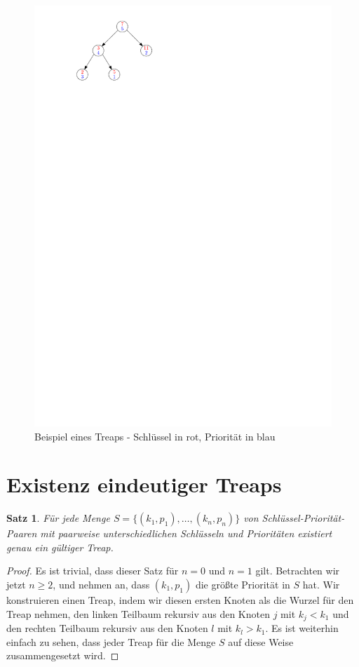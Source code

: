 \documentclass[a4paper]{scrreprt}
\newtheorem{satz}{Satz}[chapter]
\theoremstyle{definition}
\newenvironment{beweis}{\begin{proof}}{\end{proof}}
\begin{document}
\begin{figure}
\centering
\label{img:exampletreap}
\includegraphics{img/Beispiel_Treap.pdf}
\caption{Beispiel eines Treaps - Schlüssel in rot, Priorität in blau}
\end{figure}


\section{Existenz eindeutiger Treaps}
\label{sec:uniquetreaps}

\begin{satz}
Für jede Menge $S = \{(k_1,p_1), \dots, (k_n, p_n)\}$ von Schlüssel-Priorität-Paaren mit paarweise unterschiedlichen Schlüsseln und Prioritäten existiert genau ein gültiger Treap.
\end{satz}
\begin{beweis}
Es ist trivial, dass dieser Satz für $n = 0$ und $n = 1$ gilt. Betrachten wir jetzt $n \geq 2$, und nehmen an, dass $(k_1, p_1)$ die größte Priorität in $S$ hat. Wir konstruieren einen Treap, indem wir diesen ersten Knoten als die Wurzel für den Treap nehmen, den linken Teilbaum rekursiv aus den Knoten $j$ mit $k_j < k_1$ und den rechten Teilbaum rekursiv aus den Knoten $l$ mit $k_l > k_1$. Es ist weiterhin einfach zu sehen, dass jeder Treap für die Menge $S$ auf diese Weise zusammengesetzt wird.
\end{beweis}
\end{document}
